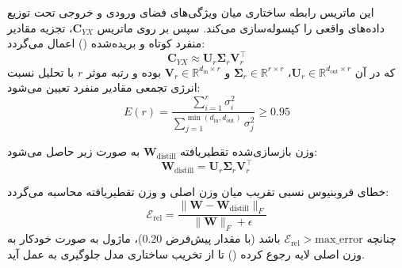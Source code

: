 این ماتریس رابطه ساختاری میان ویژگی‌های فضای ورودی و خروجی تحت توزیع داده‌های واقعی را کپسوله‌سازی می‌کند. سپس بر روی ماتریس $\mathbf{C}_{YX}$، تجزیه مقادیر منفرد کوتاه و بریده‌شده () اعمال می‌گردد:
\begin{equation}
\mathbf{C}_{YX} \approx \mathbf{U}_r \mathbf{\Sigma}_r \mathbf{V}_r^\top
\end{equation}
که در آن $\mathbf{U}_r \in \mathbb{R}^{d_{\text{out}} \times r}$، $\mathbf{\Sigma}_r \in \mathbb{R}^{r \times r}$ و $\mathbf{V}_r \in \mathbb{R}^{d_{\text{in}} \times r}$ بوده و رتبه موثر $r$ با تحلیل نسبت انرژی تجمعی مقادیر منفرد تعیین می‌شود:
\begin{equation}
E(r) = \frac{\sum_{i=1}^r \sigma_i^2}{\sum_{j=1}^{\min(d_{\text{in}}, d_{\text{out}})} \sigma_j^2} \ge 0.95
\end{equation}

وزن بازسازی‌شده تقطیریافته $\mathbf{W}_{\text{distill}}$ به صورت زیر حاصل می‌شود:
\begin{equation}
\mathbf{W}_{\text{distill}} = \mathbf{U}_r \mathbf{\Sigma}_r \mathbf{V}_r^\top
\end{equation}

خطای فروبنیوس نسبی تقریب میان وزن اصلی و وزن تقطیریافته محاسبه می‌گردد:
\begin{equation}
\mathcal{E}_{\text{rel}} = \frac{\|\mathbf{W} - \mathbf{W}_{\text{distill}}\|_F}{\|\mathbf{W}\|_F + \epsilon}
\end{equation}
چنانچه $\mathcal{E}_{\text{rel}} > \text{max\_error}$ باشد (با مقدار پیش‌فرض $0.20$)، ماژول به صورت خودکار به وزن اصلی لایه رجوع کرده () تا از تخریب ساختاری مدل جلوگیری به عمل آید.

